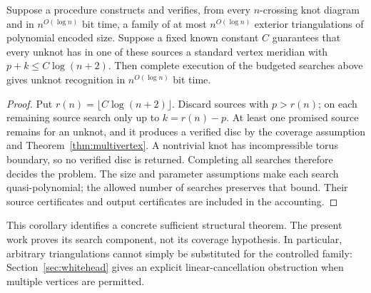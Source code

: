 \begin{corollary}
\label{cor:qp}
Suppose a procedure constructs and verifies, from every $n$-crossing knot
diagram and in $n^{O(\log n)}$ bit time, a family of at most
$n^{O(\log n)}$ exterior triangulations of polynomial encoded size.
Suppose a fixed known constant $C$ guarantees that every unknot has in
one of these sources a standard vertex meridian with
$p+k\le C\log(n+2)$. Then complete execution of the budgeted searches above gives
unknot recognition in $n^{O(\log n)}$ bit time.
\end{corollary}
\begin{proof}
Put $r(n)=\lfloor C\log(n+2)\rfloor$. Discard sources with $p>r(n)$;
on each remaining source search only up to $k=r(n)-p$. At least one
promised source remains for an unknot, and it produces a verified disc
by the coverage assumption and Theorem~\ref{thm:multivertex}.
A nontrivial knot has incompressible torus
boundary, so no verified disc is returned. Completing all searches
therefore decides the problem. The size and parameter assumptions make
each search quasi-polynomial; the allowed number of searches preserves
that bound. Their source certificates and output certificates are
included in the accounting.
\end{proof}

This corollary identifies a concrete sufficient structural theorem. The
present work proves its search component, not its coverage hypothesis.
In particular, arbitrary triangulations cannot simply be substituted for
the controlled family: Section~\ref{sec:whitehead} gives an explicit
linear-cancellation obstruction when multiple vertices are permitted.
